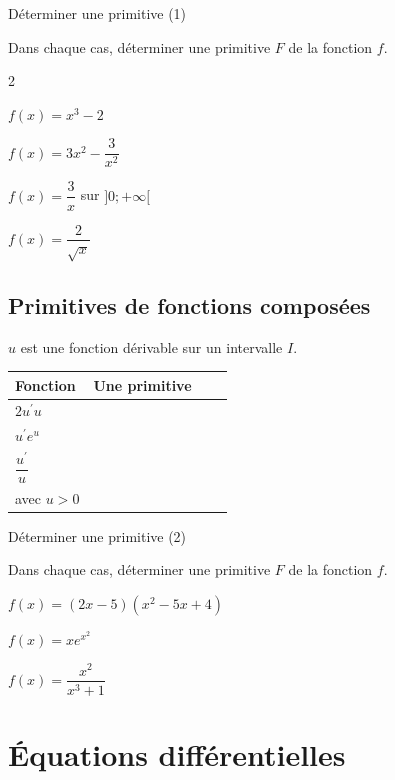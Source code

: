 \begin{bmethodet}{Déterminer une primitive (1)}
	
	Dans chaque cas, déterminer une primitive $F$ de la fonction $f$.
	\begin{multicols}{2}
		\begin{enumMet}
		\item $f(x)=x^{3}-2$
		\item $f(x)=3 x^{2}-\dfrac{3}{x^{2}}$
		\item $f(x)=\dfrac{3}{x}$ sur $] 0 ;+\infty[$
		\item $f(x)=\dfrac{2}{\sqrt{x}}$
	\end{enumMet}
	\end{multicols}
\end{bmethodet}

\subsection{Primitives de fonctions composées}
$u$ est une fonction dérivable sur un intervalle $I$.

\begin{center}
	\renewcommand{\arraystretch}{1.7}
	\begin{tabular}{|Xc|Xc|}
		\hline
		Fonction & Une primitive \\
		\hline
		$2 u^{\prime} u$ & \\
		\hline
		$u^{\prime} e^{u}$ & \\
		\hline
		$\dfrac{u^{\prime}}{u}$ & \\
		avec $u>0$ &  \\
		\hline
	\end{tabular}
\end{center}


\begin{bmethodet}{Déterminer une primitive (2)}
	
	Dans chaque cas, déterminer une primitive $F$ de la fonction $f$.
		\begin{enumMet}
		\item $f(x)=(2 x-5)\left(x^{2}-5 x+4\right)$
		\item $f(x)=x e^{x^{2}}$
		\item $f(x)=\dfrac{x^{2}}{x^{3}+1}$
	\end{enumMet}
\end{bmethodet}

\section{Équations différentielles}
